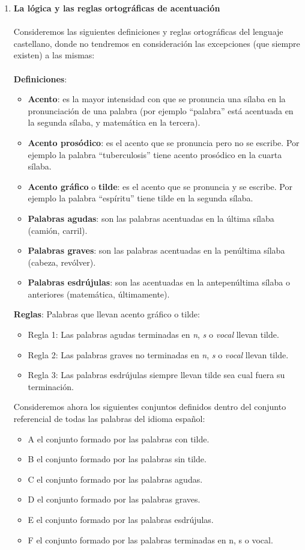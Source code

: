 \documentclass[12pt]{article}
\theoremstyle{definition}
\theoremstyle{remark}
\begin{document}
\begin{enumerate}
\item \textbf{La lógica y las reglas ortográficas de acentuación}\\
\\Consideremos las siguientes definiciones y reglas ortográficas del lenguaje castellano, donde no tendremos en consideración las excepciones (que siempre existen) a las mismas:\\
\\
\textbf{Definiciones}:
\begin{itemize}
\setlength\itemsep{0em}
\item \textbf{Acento}: es la mayor intensidad con que se pronuncia una sílaba en la pronunciación de una palabra (por ejemplo “palabra” está acentuada en la segunda sílaba, y matemática en la tercera).
\item \textbf{Acento prosódico}: es el acento que se pronuncia pero no se escribe. Por ejemplo la palabra “tuberculosis” tiene acento prosódico en la cuarta sílaba. 
\item \textbf{Acento gráfico} o \textbf{tilde}: es el acento que se pronuncia y se escribe. Por ejemplo la palabra “espíritu” tiene tilde en la segunda sílaba.
\item \textbf{Palabras agudas}: son las palabras acentuadas en la última sílaba (camión, carril).
\item \textbf{Palabras graves}: son las palabras acentuadas en la penúltima sílaba (cabeza, revólver). 
\item \textbf{Palabras esdrújulas}: son las acentuadas en la antepenúltima sílaba o anteriores (matemática, últimamente).
\end{itemize}

\textbf{Reglas}: Palabras que llevan acento gráfico o tilde:
\begin{itemize}
\setlength\itemsep{0em}
\item Regla 1: Las palabras agudas terminadas en \textit{n}, \textit{s} o \textit{vocal} llevan tilde.
\item Regla 2: Las palabras graves no terminadas en \textit{n}, \textit{s} o \textit{vocal} llevan tilde.
\item Regla 3: Las palabras esdrújulas siempre llevan tilde sea cual fuera su terminación.   
\end{itemize}

Consideremos ahora los siguientes conjuntos definidos dentro del conjunto referencial de todas las palabras del idioma español:
\begin{itemize}
\setlength\itemsep{0em}
\item A el conjunto formado por las palabras con tilde.
\item B el conjunto formado por las palabras sin tilde.
\item C el conjunto formado por las palabras agudas.
\item D el conjunto formado por las palabras graves.
\item E el conjunto formado por las palabras esdrújulas. 
\item F el conjunto formado por las palabras terminadas en n, s o vocal.
\end{itemize}


\end{enumerate}
\end{document}
